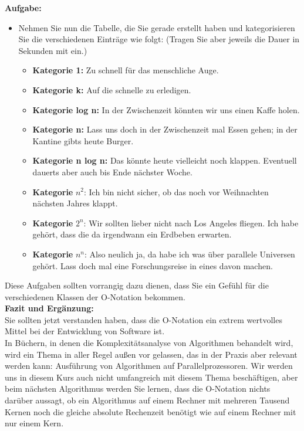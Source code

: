 \textbf{Aufgabe:}\\

\begin{itemize}
	\item Nehmen Sie nun die Tabelle, die Sie gerade erstellt haben und kategorisieren Sie die verschiedenen Einträge wie folgt: (Tragen Sie aber jeweils die Dauer in Sekunden mit ein.)
	
	\begin{itemize}
		\item \textbf{Kategorie 1:} Zu schnell für das menschliche Auge.
		\item \textbf{Kategorie k:} Auf die schnelle zu erledigen.
		\item \textbf{Kategorie log n:} In der Zwischenzeit könnten wir uns einen Kaffe holen.
		\item \textbf{Kategorie n:} Lass uns doch in der Zwischenzeit mal Essen gehen; in der Kantine gibts heute Burger.
		\item \textbf{Kategorie n log n:} Das könnte heute vielleicht noch klappen. Eventuell dauerts aber auch bis Ende nächster Woche.
		\item \textbf{Kategorie }\(n^2\): Ich bin nicht sicher, ob das noch vor Weihnachten nächsten Jahres klappt.
		\item \textbf{Kategorie }\(2^n\): Wir sollten lieber nicht nach Los Angeles fliegen. Ich habe gehört, dass die da irgendwann ein Erdbeben erwarten.
		\item \textbf{Kategorie }\(n^n\): Also neulich ja, da habe ich was über parallele Universen gehört. Lass doch mal eine Forschungsreise in eines davon machen.
	\end{itemize}
\end{itemize}

Diese Aufgaben sollten vorrangig dazu dienen, dass Sie ein Gefühl für die verschiedenen Klassen der O-Notation bekommen.\\

\textbf{Fazit und Ergänzung:}\\

Sie sollten jetzt verstanden haben, dass die O-Notation ein extrem wertvolles Mittel bei der Entwicklung von Software ist.\\

In Büchern, in denen die Komplexitätsanalyse von Algorithmen behandelt wird, wird ein Thema in aller Regel außen vor gelassen, das in der Praxis aber  relevant werden kann: Ausführung von Algorithmen auf Parallelprozessoren. Wir werden uns in diesem Kurs auch nicht umfangreich mit diesem Thema beschäftigen, aber beim nächsten Algorithmus werden Sie lernen, dass die O-Notation nichts darüber aussagt, ob ein Algorithmus auf einem Rechner mit mehreren Tausend Kernen noch die gleiche absolute Rechenzeit benötigt wie auf einem Rechner mit nur einem Kern.\\


